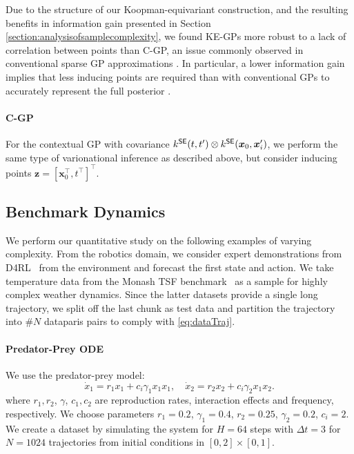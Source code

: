 Due to the structure of our Koopman-equivariant construction, and the resulting benefits in information gain presented in Section \ref{section:analysisofsamplecomplexity}, we found KE-GPs more robust to a lack of correlation between points than C-GP, an issue commonly observed in conventional sparse GP approximations \citep{Murray2010,HensmanNIPS2015}. In particular, a lower information gain implies that less inducing points are required than with conventional GPs to accurately represent the full posterior \citep{Burt2019RatesRegression}.%

\paragraph{C-GP}
For the contextual GP \citep{Li2024STkernel} with covariance $k^{{\textsf{SE}}}(t,t^\prime)\otimes k^{{\textsf{SE}}}(\bm{x}_0,\bm{x}^\prime_i)$, we perform the same type of varionational inference as described above, but consider inducing points $\bm{z}=[\bm{x}_0^\top,t^\top]^\top$.

\subsection{Benchmark Dynamics}
We perform our quantitative study on the following examples of varying complexity. 
From the robotics domain, we consider expert demonstrations from D4RL~\citep{fu2020d4rl} from the  environment and forecast the first state and action. We take temperature data from the {Monash TSF} benchmark~\citep{godahewa2021monash} as a sample for highly complex weather dynamics. Since the latter datasets provide a single long trajectory, we split off the last chunk as test data and partition the trajectory into \#$N$ dataparis pairs to comply with \eqref{eq:dataTraj}.

\paragraph{Predator-Prey ODE} We use the predator-prey model:
\begin{equation}\label{eq:volterra_lotka}
    \dot{x}_{1} = r_{1}  x_{1} + c_{i}  \gamma_{1} x_{1}  x_{1}
,\quad
\dot{x}_{2} = r_{2}  x_{2} + c_{i} \gamma_{2} x_{1}  x_{2}
.
\end{equation}%
where $r_1,r_2$, $\gamma$, $c_1,c_2$ are reproduction rates, interaction effects and frequency, respectively. We choose parameters $r_1{=}0.2$, $\gamma_1{=}0.4$, $r_2{=}0.25$, $\gamma_2{=}0.2$, $c_i=2$. We create a dataset by simulating the system for $H=64$ steps with $\Delta t=3$ for $N=1024$ trajectories from initial conditions in $[0, 2]\times [0, 1]$.


